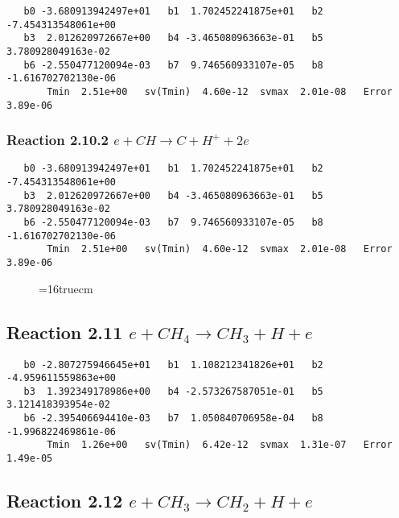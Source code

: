 \documentclass[12pt]{article}
\begin{document}
\begin{small}\begin{verbatim} 
   b0 -3.680913942497e+01   b1  1.702452241875e+01   b2 -7.454313548061e+00
   b3  2.012620972667e+00   b4 -3.465080963663e-01   b5  3.780928049163e-02
   b6 -2.550477120094e-03   b7  9.746560933107e-05   b8 -1.616702702130e-06
       Tmin  2.51e+00   sv(Tmin)  4.60e-12  svmax  2.01e-08   Error  3.89e-06
\end{verbatim}\end{small}

\subsubsection{
Reaction 2.10.2   $e + CH \rightarrow C + H^+ + 2e$
}

\begin{small}\begin{verbatim} 
   b0 -3.680913942497e+01   b1  1.702452241875e+01   b2 -7.454313548061e+00
   b3  2.012620972667e+00   b4 -3.465080963663e-01   b5  3.780928049163e-02
   b6 -2.550477120094e-03   b7  9.746560933107e-05   b8 -1.616702702130e-06
       Tmin  2.51e+00   sv(Tmin)  4.60e-12  svmax  2.01e-08   Error  3.89e-06
\end{verbatim}\end{small}

\begin{figure} \label{met.2_2.10}
\epsfxsize=16truecm
\end{figure}
\newpage
 
\subsection{ 
Reaction 2.11      $e + CH_4 \rightarrow CH_3 + H + e$
}

\begin{small}\begin{verbatim} 
   b0 -2.807275946645e+01   b1  1.108212341826e+01   b2 -4.959611559863e+00
   b3  1.392349178986e+00   b4 -2.573267587051e-01   b5  3.121418393954e-02
   b6 -2.395406694410e-03   b7  1.050840706958e-04   b8 -1.996822469861e-06
       Tmin  1.26e+00   sv(Tmin)  6.42e-12  svmax  1.31e-07   Error  1.49e-05
\end{verbatim}\end{small}

\subsection{ 
Reaction 2.12      $e + CH_3 \rightarrow CH_2 + H + e$
}
\end{document}
